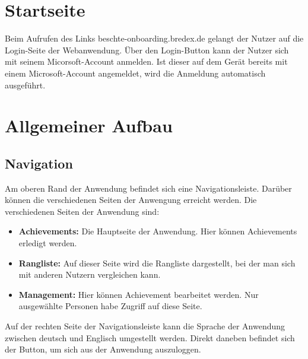\documentclass[11pt]{article}
\begin{document}
\tableofcontents
{}
\newpage
{}
\pagestyle{fancy}

\section{Startseite}
Beim Aufrufen des Links beschte-onboarding.bredex.de gelangt der Nutzer auf die Login-Seite der Webanwendung.
Über den Login-Button kann der Nutzer sich mit seinem Micorsoft-Account anmelden. Ist dieser auf dem Gerät bereits mit einem
Microsoft-Account angemeldet, wird die Anmeldung automatisch ausgeführt.


\section{Allgemeiner Aufbau}

\subsection{Navigation}
Am oberen Rand der Anwendung befindet sich eine Navigationsleiste. Darüber können die verschiedenen Seiten der Anwengung erreicht werden.
Die verschiedenen Seiten der Anwendung sind:
\begin{itemize}
    \item \textbf{Achievements: } Die Hauptseite der Anwendung. Hier können Achievements erledigt werden.
    \item \textbf{Rangliste: } Auf dieser Seite wird die Rangliste dargestellt, bei der man sich mit anderen Nutzern vergleichen kann.
    \item \textbf{Management: } Hier können Achievement bearbeitet werden. Nur ausgewählte Personen habe Zugriff auf diese Seite.
\end{itemize}

Auf der rechten Seite der Navigationsleiste kann die Sprache der Anwendung zwischen deutsch und Englisch umgestellt werden. Direkt daneben befindet sich der Button,
um sich aus der Anwendung auszuloggen.  
\end{document}
